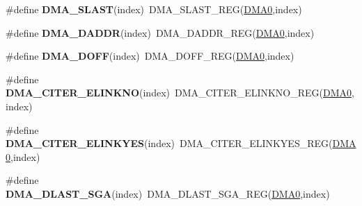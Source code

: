 \begin{DoxyCompactItemize}
\item 
\#define {\bfseries D\+M\+A\+\_\+\+S\+L\+A\+ST}(index)~D\+M\+A\+\_\+\+S\+L\+A\+S\+T\+\_\+\+R\+EG(\hyperlink{group__DMA__Peripheral__Access__Layer_ga4103044f9ca209772f513dc694513ffb}{D\+M\+A0},index)\hypertarget{group__DMA__Register__Accessor__Macros_gafe14777337c386e625ae3a66162832c9}{}\label{group__DMA__Register__Accessor__Macros_gafe14777337c386e625ae3a66162832c9}

\item 
\#define {\bfseries D\+M\+A\+\_\+\+D\+A\+D\+DR}(index)~D\+M\+A\+\_\+\+D\+A\+D\+D\+R\+\_\+\+R\+EG(\hyperlink{group__DMA__Peripheral__Access__Layer_ga4103044f9ca209772f513dc694513ffb}{D\+M\+A0},index)\hypertarget{group__DMA__Register__Accessor__Macros_gac891509293585f659dec043eb18e381f}{}\label{group__DMA__Register__Accessor__Macros_gac891509293585f659dec043eb18e381f}

\item 
\#define {\bfseries D\+M\+A\+\_\+\+D\+O\+FF}(index)~D\+M\+A\+\_\+\+D\+O\+F\+F\+\_\+\+R\+EG(\hyperlink{group__DMA__Peripheral__Access__Layer_ga4103044f9ca209772f513dc694513ffb}{D\+M\+A0},index)\hypertarget{group__DMA__Register__Accessor__Macros_gab285e557469e7f2e4501337a5817fe19}{}\label{group__DMA__Register__Accessor__Macros_gab285e557469e7f2e4501337a5817fe19}

\item 
\#define {\bfseries D\+M\+A\+\_\+\+C\+I\+T\+E\+R\+\_\+\+E\+L\+I\+N\+K\+NO}(index)~D\+M\+A\+\_\+\+C\+I\+T\+E\+R\+\_\+\+E\+L\+I\+N\+K\+N\+O\+\_\+\+R\+EG(\hyperlink{group__DMA__Peripheral__Access__Layer_ga4103044f9ca209772f513dc694513ffb}{D\+M\+A0},index)\hypertarget{group__DMA__Register__Accessor__Macros_gaa43fe51df00c21f4267edeedbbb6e68e}{}\label{group__DMA__Register__Accessor__Macros_gaa43fe51df00c21f4267edeedbbb6e68e}

\item 
\#define {\bfseries D\+M\+A\+\_\+\+C\+I\+T\+E\+R\+\_\+\+E\+L\+I\+N\+K\+Y\+ES}(index)~D\+M\+A\+\_\+\+C\+I\+T\+E\+R\+\_\+\+E\+L\+I\+N\+K\+Y\+E\+S\+\_\+\+R\+EG(\hyperlink{group__DMA__Peripheral__Access__Layer_ga4103044f9ca209772f513dc694513ffb}{D\+M\+A0},index)\hypertarget{group__DMA__Register__Accessor__Macros_ga554e01071bdc2ac1279190af717f19d6}{}\label{group__DMA__Register__Accessor__Macros_ga554e01071bdc2ac1279190af717f19d6}

\item 
\#define {\bfseries D\+M\+A\+\_\+\+D\+L\+A\+S\+T\+\_\+\+S\+GA}(index)~D\+M\+A\+\_\+\+D\+L\+A\+S\+T\+\_\+\+S\+G\+A\+\_\+\+R\+EG(\hyperlink{group__DMA__Peripheral__Access__Layer_ga4103044f9ca209772f513dc694513ffb}{D\+M\+A0},index)\hypertarget{group__DMA__Register__Accessor__Macros_gace4dc3fb97989651bf0f8f4bd9ff4df9}{}\label{group__DMA__Register__Accessor__Macros_gace4dc3fb97989651bf0f8f4bd9ff4df9}


\end{DoxyCompactItemize}
